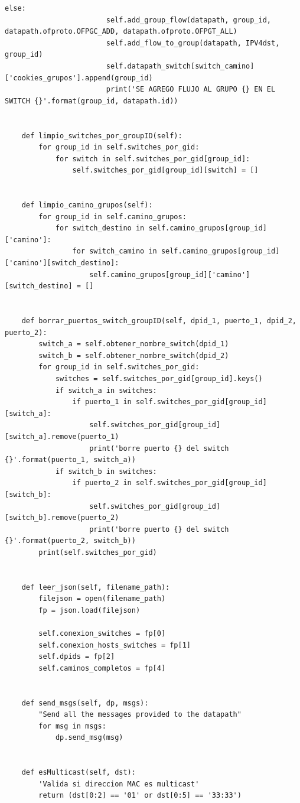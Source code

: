\documentclass[12pt,a4paper,oneside]{book}
\begin{document}
\begin{lstlisting}[style=codigobase,  label = cod_correrP, caption= controlador.py]
                    else:
                        self.add_group_flow(datapath, group_id, datapath.ofproto.OFPGC_ADD, datapath.ofproto.OFPGT_ALL)
                        self.add_flow_to_group(datapath, IPV4dst, group_id)
                        self.datapath_switch[switch_camino]['cookies_grupos'].append(group_id)
                        print('SE AGREGO FLUJO AL GRUPO {} EN EL SWITCH {}'.format(group_id, datapath.id))


    def limpio_switches_por_groupID(self):
        for group_id in self.switches_por_gid:
            for switch in self.switches_por_gid[group_id]:
                self.switches_por_gid[group_id][switch] = []


    def limpio_camino_grupos(self):
        for group_id in self.camino_grupos:
            for switch_destino in self.camino_grupos[group_id]['camino']:
                for switch_camino in self.camino_grupos[group_id]['camino'][switch_destino]:
                    self.camino_grupos[group_id]['camino'][switch_destino] = []


    def borrar_puertos_switch_groupID(self, dpid_1, puerto_1, dpid_2, puerto_2):
        switch_a = self.obtener_nombre_switch(dpid_1)
        switch_b = self.obtener_nombre_switch(dpid_2)
        for group_id in self.switches_por_gid:
            switches = self.switches_por_gid[group_id].keys()
            if switch_a in switches:
                if puerto_1 in self.switches_por_gid[group_id][switch_a]:
                    self.switches_por_gid[group_id][switch_a].remove(puerto_1)
                    print('borre puerto {} del switch {}'.format(puerto_1, switch_a))
            if switch_b in switches:
                if puerto_2 in self.switches_por_gid[group_id][switch_b]:
                    self.switches_por_gid[group_id][switch_b].remove(puerto_2)
                    print('borre puerto {} del switch {}'.format(puerto_2, switch_b))
        print(self.switches_por_gid)


    def leer_json(self, filename_path):
        filejson = open(filename_path)
    	fp = json.load(filejson)

        self.conexion_switches = fp[0]
        self.conexion_hosts_switches = fp[1]
        self.dpids = fp[2]
        self.caminos_completos = fp[4]


    def send_msgs(self, dp, msgs):
        "Send all the messages provided to the datapath"
        for msg in msgs:
            dp.send_msg(msg)


    def esMulticast(self, dst):
        'Valida si direccion MAC es multicast'
        return (dst[0:2] == '01' or dst[0:5] == '33:33')



\end{lstlisting}
\end{document}
